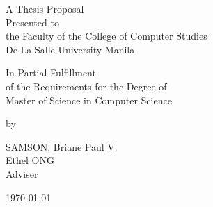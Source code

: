 %
%
%                 

\begin{titlepage}
\centering



\vspace{1.75cm}
A Thesis Proposal\\
Presented to\\
the Faculty of the College of Computer Studies\\
De La Salle University Manila

\vspace{1.75cm}
In Partial Fulfillment\\
of the Requirements for the Degree of\\

Master of Science in Computer Science

\vspace{1.75cm}
by\\
\vspace{1cm}

SAMSON, Briane Paul V.  \\

\vspace{1.75cm}
Ethel ONG \\
Adviser

\vspace{1.75cm}
\today
\end{titlepage}
